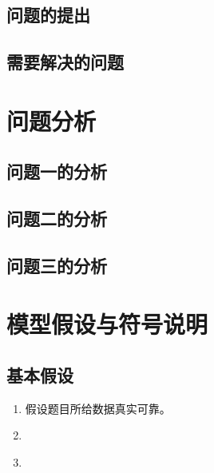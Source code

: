 \documentclass[12pt,a4paper]{article}
\begin{document}
\subsection{问题的提出}

\subsection{需要解决的问题}

\section{问题分析}

\subsection{问题一的分析}
\subsection{问题二的分析}
\subsection{问题三的分析}

\section{模型假设与符号说明}

\subsection{基本假设}
\begin{enumerate}
    \item 假设题目所给数据真实可靠。
    \item \underline{\hspace{6cm}}
    \item \underline{\hspace{6cm}}
\end{enumerate}
\end{document}
